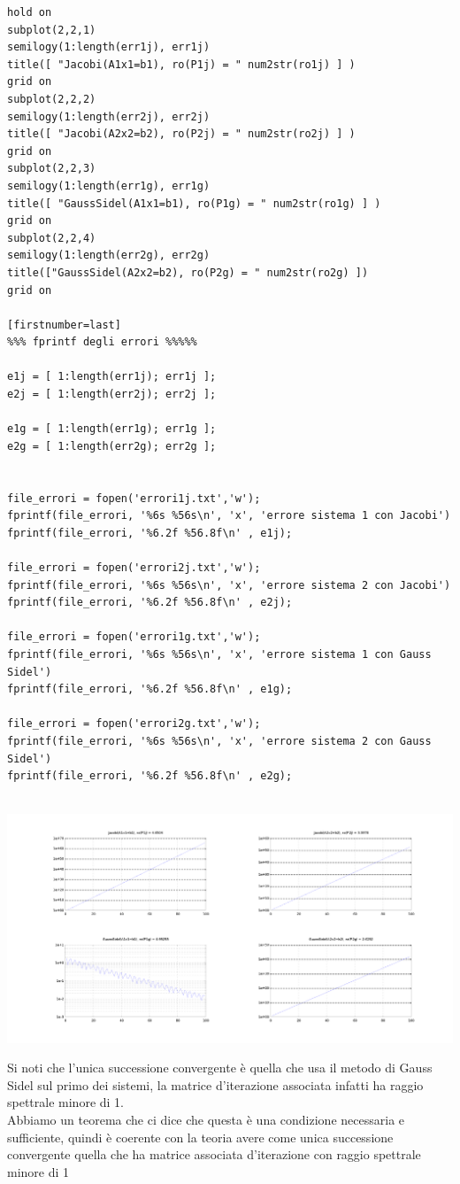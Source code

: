 \documentclass{article}
\newcommand{\vs}{\vspace*{1.0cm}}
\begin{document}
\begin{lstlisting}
hold on
subplot(2,2,1)
semilogy(1:length(err1j), err1j)
title([ "Jacobi(A1x1=b1), ro(P1j) = " num2str(ro1j) ] )
grid on
subplot(2,2,2)
semilogy(1:length(err2j), err2j)
title([ "Jacobi(A2x2=b2), ro(P2j) = " num2str(ro2j) ] )
grid on
subplot(2,2,3)
semilogy(1:length(err1g), err1g)
title([ "GaussSidel(A1x1=b1), ro(P1g) = " num2str(ro1g) ] )
grid on
subplot(2,2,4)
semilogy(1:length(err2g), err2g)
title(["GaussSidel(A2x2=b2), ro(P2g) = " num2str(ro2g) ])
grid on

[firstnumber=last]
%%% fprintf degli errori %%%%%

e1j = [ 1:length(err1j); err1j ]; 
e2j = [ 1:length(err2j); err2j ]; 

e1g = [ 1:length(err1g); err1g ]; 
e2g = [ 1:length(err2g); err2g ]; 


file_errori = fopen('errori1j.txt','w');
fprintf(file_errori, '%6s %56s\n', 'x', 'errore sistema 1 con Jacobi')
fprintf(file_errori, '%6.2f %56.8f\n' , e1j);

file_errori = fopen('errori2j.txt','w');
fprintf(file_errori, '%6s %56s\n', 'x', 'errore sistema 2 con Jacobi')
fprintf(file_errori, '%6.2f %56.8f\n' , e2j);

file_errori = fopen('errori1g.txt','w');
fprintf(file_errori, '%6s %56s\n', 'x', 'errore sistema 1 con Gauss Sidel')
fprintf(file_errori, '%6.2f %56.8f\n' , e1g);

file_errori = fopen('errori2g.txt','w');
fprintf(file_errori, '%6s %56s\n', 'x', 'errore sistema 2 con Gauss Sidel')
fprintf(file_errori, '%6.2f %56.8f\n' , e2g);


\end{lstlisting}

\centerline{\includegraphics[scale=0.5]{ex82.png}}


\vs
\begin{flushleft}
Si noti che l'unica successione convergente è quella che usa il metodo di Gauss Sidel sul primo dei sistemi, 
la matrice d'iterazione associata infatti ha raggio spettrale minore di 1.\\
Abbiamo un teorema che ci dice che questa è una condizione necessaria e sufficiente, quindi è coerente con la teoria avere come unica successione convergente quella che ha matrice associata d'iterazione con raggio spettrale minore di 1
\end{flushleft}
\vs
\end{document}

